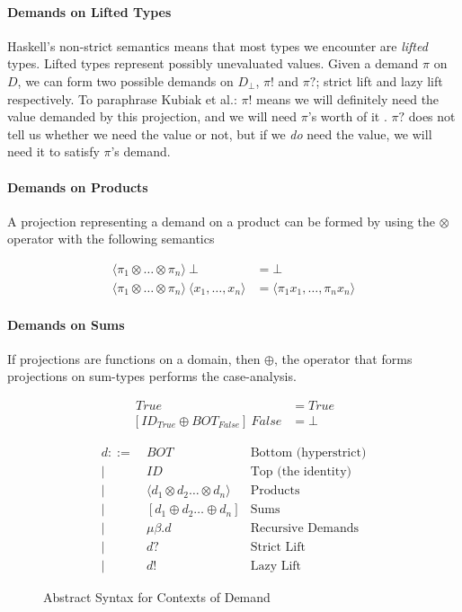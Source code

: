 \paragraph{Demands on Lifted Types} Haskell's non-strict semantics means that
most types we encounter are \emph{lifted} types.  Lifted types represent
possibly unevaluated values. Given a demand $\pi$ on $D$, we can form two
possible demands on $D_{\bot}$, $\pi!$ and $\pi?$; strict lift and lazy lift
respectively. To paraphrase Kubiak et al.: $\pi!$ means we will definitely need
the value demanded by this projection, and we will need $\pi$'s worth of it
\citep{kubiak}. $\pi?$ does not tell us whether we need the value or not, but if
we \emph{do} need the value, we will need it to satisfy $\pi$'s demand.

\paragraph{Demands on Products} A projection representing a demand on a product
can be formed by using the $\otimes$ operator with the following semantics

\begin{align*}
\langle \pi_{1} \otimes \dots \otimes \pi_{n} \rangle \ \bot &= \bot \\
\langle \pi_{1} \otimes \dots \otimes \pi_{n} \rangle \ 
\langle x_{1}, \dots, x_{n} \rangle &= \langle \pi_{1} x_{1}, \dots, \pi_{n} x_{n} \rangle
\end{align*}

\paragraph{Demands on Sums} If projections are functions on a domain, then
$\oplus$, the operator that forms projections on sum-types performs the case-analysis.

\begin{align*}
[ID_{True} \oplus ID_{False}]  \ True &= True \\
[ID_{True} \oplus BOT_{False}] \ False &= \bot
\end{align*}

\begin{figure}
\begin{align*}
    d ::=&\ BOT              & \text{Bottom (hyperstrict)} \\
        |&\ ID               & \text{Top (the identity)} \\
        |&\ \langle d_{1} \otimes d_{2} \dots \otimes d_{n} \rangle   & \text{Products} \\ 
        |&\ [d_{1} \oplus d_{2} \dots \oplus d_{n}]    & \text{Sums} \\ 
        |&\ \mu\beta . d     & \text{Recursive Demands} \\
        |&\ d?               & \text{Strict Lift} \\
        |&\ d!               & \text{Lazy Lift}
\end{align*}
\caption{Abstract Syntax for Contexts of Demand}
\label{fig:ContextAST}
\end{figure}


